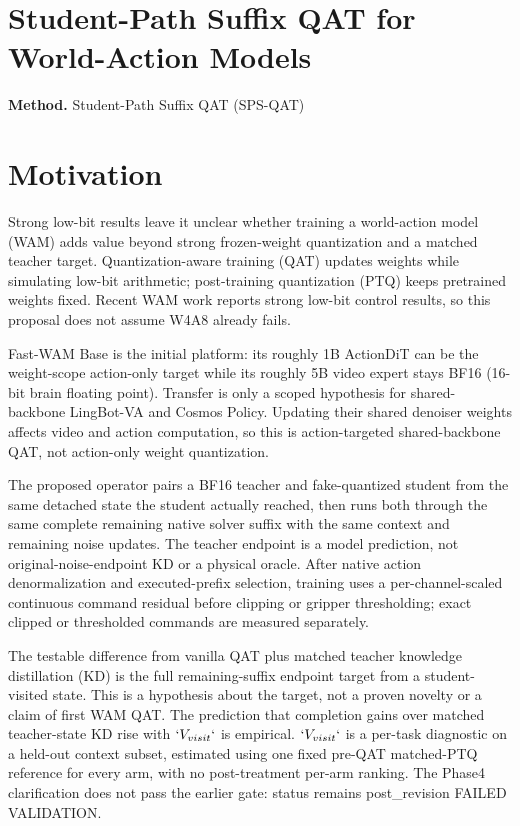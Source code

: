 \documentclass[10pt,a4paper]{article}
\begin{document}
\begin{center}\end{center}\par\smallskip

\section*{Student-Path Suffix QAT for World-Action Models}
\textbf{Method.} Student-Path Suffix QAT (SPS-QAT)
\section*{Motivation}
Strong low-bit results leave it unclear whether training a world-action model (WAM) adds value beyond strong frozen-weight quantization and a matched teacher target. Quantization-aware training (QAT) updates weights while simulating low-bit arithmetic;\allowbreak{} post-training quantization (PTQ) keeps pretrained weights fixed. Recent WAM work reports strong low-bit control results, so this proposal does not assume W4A8 already fails.

Fast-WAM Base is the initial platform: its roughly 1B ActionDiT can be the weight-scope action-only target while its roughly 5B video expert stays BF16 (16-bit brain floating point). Transfer is only a scoped hypothesis for shared-backbone LingBot-VA and Cosmos Policy. Updating their shared denoiser weights affects video and action computation, so this is action-targeted shared-backbone QAT, not action-only weight quantization.

The proposed operator pairs a BF16 teacher and fake-quantized student from the same detached state the student actually reached, then runs both through the same complete remaining native solver suffix with the same context and remaining noise updates. The teacher endpoint is a model prediction, not original-noise-endpoint KD or a physical oracle. After native action denormalization and executed-prefix selection, training uses a per-channel-scaled continuous command residual before clipping or gripper thresholding;\allowbreak{} exact clipped or thresholded commands are measured separately.

The testable difference from vanilla QAT plus matched teacher knowledge distillation (KD) is the full remaining-suffix endpoint target from a student-visited state. This is a hypothesis about the target, not a proven novelty or a claim of first WAM QAT. The prediction that completion gains over matched teacher-state KD rise with \(`V_{visit}`\) is empirical. \(`V_{visit}`\) is a per-task diagnostic on a held-out context subset, estimated using one fixed pre-QAT matched-PTQ reference for every arm, with no post-treatment per-arm ranking. The Phase4 clarification does not pass the earlier gate: status remains post\_revision FAILED VALIDATION.
\end{document}
